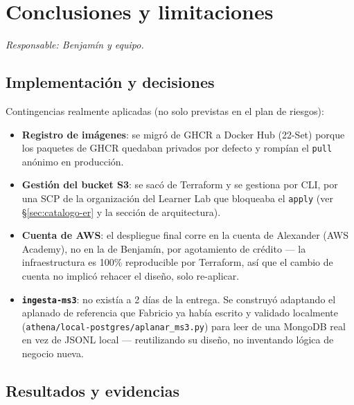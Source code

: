 \section{Conclusiones y limitaciones}
\textit{Responsable: Benjamín y equipo.}


\subsection{Implementación y decisiones}

Contingencias realmente aplicadas (no solo previstas en el plan de riesgos):

\begin{itemize}
\item \textbf{Registro de imágenes}: se migró de GHCR a Docker Hub (22-Set) porque los paquetes de
  GHCR quedaban privados por defecto y rompían el \texttt{pull} anónimo en producción.
\item \textbf{Gestión del bucket S3}: se sacó de Terraform y se gestiona por CLI, por una SCP de la
  organización del Learner Lab que bloqueaba el \texttt{apply} (ver \S\ref{sec:catalogo-er} y la
  sección de arquitectura).
\item \textbf{Cuenta de AWS}: el despliegue final corre en la cuenta de Alexander (AWS Academy),
  no en la de Benjamín, por agotamiento de crédito — la infraestructura es 100\% reproducible por
  Terraform, así que el cambio de cuenta no implicó rehacer el diseño, solo re-aplicar.
\item \textbf{\texttt{ingesta-ms3}}: no existía a 2 días de la entrega. Se construyó adaptando el
  aplanado de referencia que Fabricio ya había escrito y validado localmente
  (\texttt{athena/local-postgres/aplanar\_ms3.py}) para leer de una MongoDB real en vez de JSONL
  local — reutilizando su diseño, no inventando lógica de negocio nueva.
\end{itemize}

\subsection{Resultados y evidencias}

